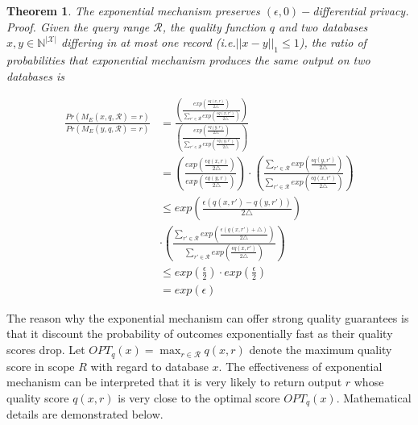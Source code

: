 \documentclass[a4paper, 11pt]{article} %
\makeatletter
\DeclareRobustCommand{\ie}{i.e.\@\xspace}
\newtheorem{theorem}{Theorem}
\theoremstyle{definition}
\makeatother
\begin{document}
\begin{theorem}
The exponential mechanism preserves $(\epsilon, 0)-$differential privacy.
\textit{Proof. Given the query range $\mathcal{R}$, the quality function $q$ and two databases $x, y \in \mathbb{N}^{|\mathcal{X}|}$ differing in at most one record (\ie $||x-y||_1 \leq 1$), the ratio of probabilities that exponential mechanism produces the same output on two databases is }

\begin{align}
\frac{Pr(M_E(x, q, \mathcal{R})=r)}{Pr(M_E(y, q, \mathcal{R})=r)} &= 
 \frac{
\left(
\frac{exp( \frac{\epsilon q(x,r) }{2 \triangle})}{\sum_{r' \in \mathcal{R}} exp( \frac{\epsilon q(x,r') }{2 \triangle})}
\right)
}
{
\left(
\frac{exp( \frac{\epsilon q(y,r) }{2 \triangle})}{\sum_{r' \in \mathcal{R}} exp( \frac{\epsilon q(y,r') }{2 \triangle})}
\right)
} \\
&= 
\left(
\frac{exp( \frac{\epsilon q(x,r) }{2 \triangle})}
{exp( \frac{\epsilon q(y,r) }{2 \triangle})}
\right)
\cdot
\left(
\frac{\sum_{r' \in \mathcal{R}} exp( \frac{\epsilon q(y,r') }{2 \triangle})}{\sum_{r' \in \mathcal{R}} exp( \frac{\epsilon q(x,r') }{2 \triangle})}
\right) \\
& \leq exp \left(
\frac{\epsilon (q(x, r') - q(y, r') )}{2 \triangle} 
\right) \\
& \cdot
\left(
\frac{\sum_{r' \in \mathcal{R}} exp( \frac{\epsilon (q(x,r')+\triangle) }{2 \triangle})}
{\sum_{r' \in \mathcal{R}} exp( \frac{\epsilon q(x,r') }{2 \triangle})}
\right) \\
& \leq exp(\frac{\epsilon}{2}) \cdot exp(\frac{\epsilon}{2}) 
 \\
&= exp(\epsilon)
\end{align}
\end{theorem}


The reason why the exponential mechanism can offer strong quality guarantees is that it discount the probability of outcomes exponentially fast as their quality scores drop. Let $OPT_q(x) = \max_{r \in \mathcal{R}} q(x, r)$ denote the maximum quality score in scope $R$ with regard to database $x$. The effectiveness of exponential mechanism can be interpreted that it is very likely to return output $r$ whose quality score $q(x, r)$ is very close to the optimal score $OPT_q(x)$. Mathematical details are demonstrated below.
\end{document}
